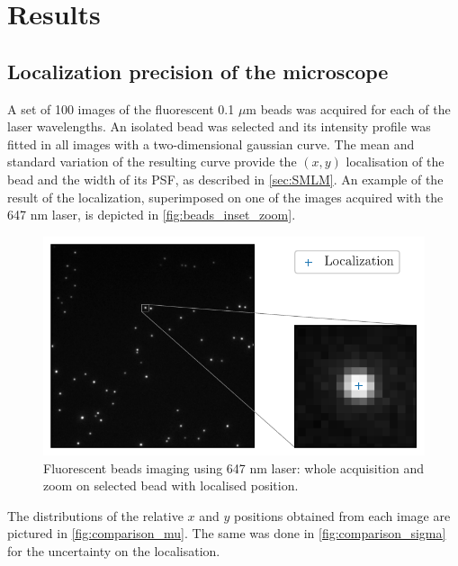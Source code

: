 \section{Results}
\subsection{Localization precision of the microscope}
A set of 100 images of the fluorescent 0.1 $\mu$m beads was acquired for each of the laser wavelengths.
An isolated bead was selected and its intensity profile was fitted in all images with a two-dimensional gaussian curve. 
The mean and standard variation of the resulting curve provide the $(x,y)$ localisation of the bead and the width of its PSF, as described in \autoref{sec:SMLM}.
An example of the result of the localization, superimposed on one of the images acquired with the 647 nm laser, is depicted in \autoref{fig:beads_inset_zoom}.
\begin{figure}[htbp]
    \centering
    \includegraphics[scale=1]{figures/beads_inset_zoom.pdf}
    \caption{Fluorescent beads imaging using 647 nm laser: whole acquisition  and zoom on selected bead with localised position.}
    \label{fig:beads_inset_zoom}
\end{figure}
The distributions of the relative $x$ and $y$ positions obtained from each image are pictured in \autoref{fig:comparison_mu}.
The same was done in \autoref{fig:comparison_sigma} for the uncertainty on the localisation.
